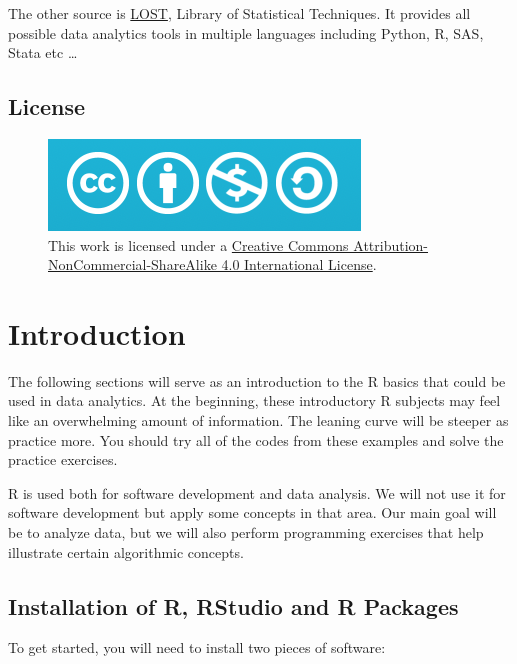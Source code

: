 \documentclass[
]{book}
\begin{document}
The other source is \href{https://lost-stats.github.io}{LOST}, Library of Statistical Techniques. It provides all possible data analytics tools in multiple languages including Python, R, SAS, Stata etc \ldots{}

\hypertarget{license}{%
\section*{License}\label{license}}

\begin{figure}
\centering
\includegraphics{png/cc.png}
\caption{This work is licensed under a \href{http://creativecommons.org/licenses/by-nc-sa/4.0/}{Creative Commons Attribution-NonCommercial-ShareAlike 4.0 International License}.}
\end{figure}

\hypertarget{introduction}{%
\chapter{Introduction}\label{introduction}}

The following sections will serve as an introduction to the R basics that could be used in data analytics. At the beginning, these introductory R subjects may feel like an overwhelming amount of information. The leaning curve will be steeper as practice more. You should try all of the codes from these examples and solve the practice exercises.

R is used both for software development and data analysis. We will not use it for software development but apply some concepts in that area. Our main goal will be to analyze data, but we will also perform programming exercises that help illustrate certain algorithmic concepts.

\hypertarget{installation-of-r-rstudio-and-r-packages}{%
\section{Installation of R, RStudio and R Packages}\label{installation-of-r-rstudio-and-r-packages}}

To get started, you will need to install two pieces of software:
\end{document}
